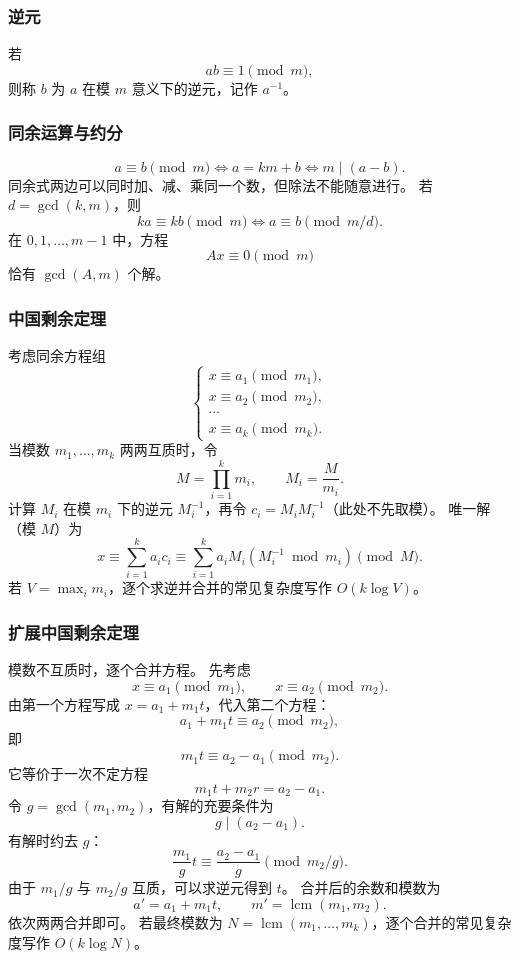 \subsubsection{逆元}

若
\[
  ab\equiv1\pmod m,
\]
则称 $b$ 为 $a$ 在模 $m$ 意义下的逆元，记作 $a^{-1}$。

\subsubsection{同余运算与约分}

\[
  a\equiv b\pmod m
  \iff a=km+b
  \iff m\mid(a-b).
\]
同余式两边可以同时加、减、乘同一个数，但除法不能随意进行。
若 $d=\gcd(k,m)$，则
\[
  ka\equiv kb\pmod m
  \iff
  a\equiv b\pmod{m/d}.
\]
在 $0,1,\ldots,m-1$ 中，方程
\[
  Ax\equiv0\pmod m
\]
恰有 $\gcd(A,m)$ 个解。

\subsubsection{中国剩余定理}

考虑同余方程组
\[
  \begin{cases}
    x\equiv a_1\pmod{m_1},\\
    x\equiv a_2\pmod{m_2},\\
    \cdots\\
    x\equiv a_k\pmod{m_k}.
  \end{cases}
\]
当模数 $m_1,\ldots,m_k$ 两两互质时，令
\[
  M=\prod_{i=1}^{k}m_i,
  \qquad M_i=\frac{M}{m_i}.
\]
计算 $M_i$ 在模 $m_i$ 下的逆元 $M_i^{-1}$，再令 $c_i=M_iM_i^{-1}$（此处不先取模）。
唯一解（模 $M$）为
\[
  x\equiv\sum_{i=1}^{k}a_ic_i
  \equiv\sum_{i=1}^{k}a_iM_i(M_i^{-1}\bmod m_i)
  \pmod M.
\]
若 $V=\max_i m_i$，逐个求逆并合并的常见复杂度写作 $O(k\log V)$。

\subsubsection{扩展中国剩余定理}

模数不互质时，逐个合并方程。
先考虑
\[
  x\equiv a_1\pmod{m_1},
  \qquad
  x\equiv a_2\pmod{m_2}.
\]
由第一个方程写成 $x=a_1+m_1t$，代入第二个方程：
\[
  a_1+m_1t\equiv a_2\pmod{m_2},
\]
即
\[
  m_1t\equiv a_2-a_1\pmod{m_2}.
\]
它等价于一次不定方程
\[
  m_1t+m_2r=a_2-a_1.
\]
令 $g=\gcd(m_1,m_2)$，有解的充要条件为
\[
  g\mid(a_2-a_1).
\]
有解时约去 $g$：
\[
  \frac{m_1}{g}t
  \equiv
  \frac{a_2-a_1}{g}
  \pmod{m_2/g}.
\]
由于 $m_1/g$ 与 $m_2/g$ 互质，可以求逆元得到 $t$。
合并后的余数和模数为
\[
  a'=a_1+m_1t,
  \qquad
  m'=\operatorname{lcm}(m_1,m_2).
\]
依次两两合并即可。
若最终模数为 $N=\operatorname{lcm}(m_1,\ldots,m_k)$，逐个合并的常见复杂度写作 $O(k\log N)$。

